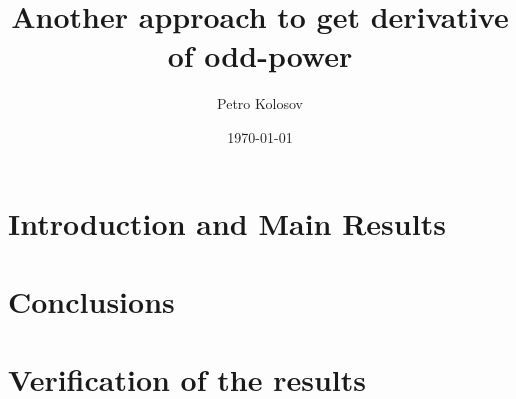 \documentclass[12pt,letterpaper,oneside,reqno]{amsart}
\title[Another approach to get derivative of odd-power]
{Another approach to get derivative of odd-power}
\author[Petro Kolosov]{Petro Kolosov}
\date{\today}
\begin{document}
%        

    \maketitle

    \tableofcontents


    \section{Introduction and Main Results} \label{sec:introduction}
    
    
    
    


    \section{Conclusions}\label{sec:conclusions}
    


    \section{Verification of the results}\label{sec:verification-of-the-results}
    

    
    
\end{document}
